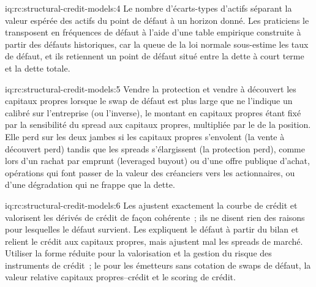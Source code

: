 \begin{solution}{iq:rc:structural-credit-models:4}
Le nombre d'écarts-types d'actifs séparant la valeur espérée des actifs du point de défaut
à un horizon donné. Les praticiens le transposent en fréquences de défaut à l'aide d'une table empirique
construite à partir des défauts historiques, car la queue de la loi normale sous-estime les taux de défaut, et ils retiennent un
point de défaut situé entre la dette à court terme et la dette totale.
\end{solution}

\begin{solution}{iq:rc:structural-credit-models:5}
Vendre la protection et vendre à découvert les capitaux propres lorsque le swap de défaut est plus large que ne l'indique un 
calibré sur l'entreprise (ou l'inverse), le montant en capitaux propres étant fixé par
la sensibilité du spread aux capitaux propres, multipliée par le  de la position. Elle perd sur les deux jambes si
les capitaux propres s'envolent (la vente à découvert perd) tandis que les spreads s'élargissent (la protection perd),
comme lors d'un rachat par emprunt (leveraged buyout) ou d'une offre publique d'achat, opérations qui font passer de la valeur des
créanciers vers les actionnaires, ou d'une dégradation qui ne frappe que la dette.
\end{solution}

\begin{solution}{iq:rc:structural-credit-models:6}
Les  ajustent exactement la courbe de crédit et valorisent les dérivés de crédit
de façon cohérente~; ils ne disent rien des raisons pour lesquelles le défaut survient. Les  expliquent
le défaut à partir du bilan et relient le crédit aux capitaux propres, mais ajustent mal les spreads de marché.
Utiliser la forme réduite pour la valorisation et la gestion du risque des instruments de crédit~; le  pour les émetteurs
sans cotation de swaps de défaut, la valeur relative capitaux propres–crédit et le scoring de crédit.
\end{solution}
